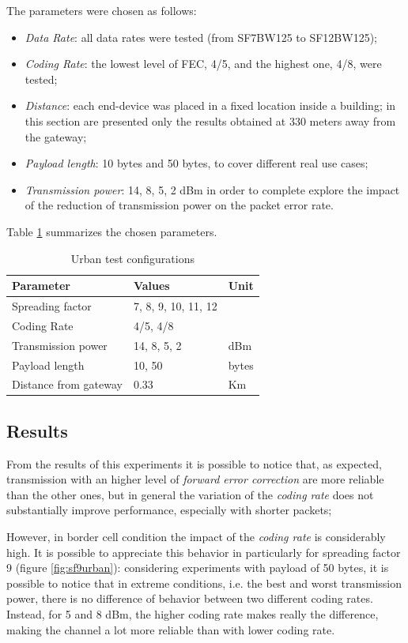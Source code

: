 The parameters were chosen as follows:
\begin{itemize}
\item \emph{Data Rate}: all data rates were tested (from SF7BW125 to SF12BW125);
\item \emph{Coding Rate}: the lowest level of FEC, 4/5, and the highest one, 4/8, were tested;
\item \emph{Distance}: each end-device was placed in a fixed location inside a building; in this section are presented only the results obtained at 330 meters away from the gateway;
\item \emph{Payload length}: 10 bytes and 50 bytes, to cover different real use cases;
\item \emph{Transmission power}: 14, 8, 5, 2 dBm in order to complete explore the impact of the reduction of transmission power on the packet error rate.
\end{itemize} 
Table \ref{tab:urbantest} summarizes the chosen parameters.

\begin{table}[]
\centering
\caption{Urban test configurations}
\label{tab:urbantest}
\begin{tabular}{@{}lll@{}}
\toprule
Parameter           & Values & Unit  \\ \midrule
Spreading factor    & 7, 8, 9, 10, 11, 12  &       \\
Coding Rate    & 4/5, 4/8  &       \\
Transmission power  & 14, 8, 5, 2  & dBm   \\
Payload length      & 10, 50 & bytes \\
Distance from gateway & 0.33 & Km    \\ \bottomrule
\end{tabular}
\end{table}


\subsection{Results}
From the results of this experiments it is possible to notice that, as expected, transmission with an higher level of \emph{forward error correction} are more reliable than the other ones, but in general the variation of the \emph{coding rate} does not substantially improve performance, especially with shorter packets;

However, in border cell condition the impact of the \emph{coding rate} is considerably high. It is possible to appreciate this behavior in particularly for spreading factor 9 (figure \ref{fig:sf9urban}): considering experiments with payload of 50 bytes, it is possible to notice that in extreme conditions, i.e. the best and worst transmission power, there is no difference of behavior between two different coding rates. Instead, for 5 and 8 dBm, the higher coding rate makes really the difference, making the channel a lot more reliable than with lower coding rate.

